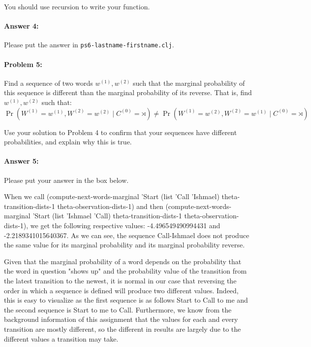 \documentclass[10pt]{article}
\newenvironment{AnswerBox}{\begin{mdframed}[style=simple]}{\end{mdframed}}
\newcommand{\PSnum}{6}
\begin{document}
You should use recursion to write your function. 

\paragraph{Answer 4:} Please put the answer in
\texttt{ps\PSnum-lastname-firstname.clj}.

\hrulefill%

\paragraph{Problem 5:}
Find a sequence of two words $w^{(1)},w^{(2)}$ such that the marginal
probability of this sequence is different than the marginal
probability of its reverse. That is, find $w^{(1)},w^{(2)}$ such that:
\begin{equation*}
  \Pr(W^{(1)}=w^{(1)}, W^{(2)} =w^{(2)} \mid C^{(0)}=\rtimes )
  \neq \Pr(W^{(1)}=w^{(2)}, W^{(2)} =w^{(1)} \mid C^{(0)}=\rtimes )
\end{equation*}

Use your solution to Problem 4 to confirm that your sequences have
different probabilities, and explain why this is true.

\paragraph{Answer 5:} Please put your answer in the box below.

\begin{AnswerBox}%


    When we call (compute-next-words-marginal 'Start (list 'Call 'Ishmael) theta-transition-dists-1 theta-observation-dists-1) and then (compute-next-words-marginal 'Start (list 'Ishmael 'Call) theta-transition-dists-1 theta-observation-dists-1), we get the following respective values: -4.496549490994431 and -2.2189341015640367. As we can see, the sequence Call-Ishmael does not produce the same value for its marginal probability and its marginal probability reverse. 

Given that the marginal probability of a word depends on the probability that the word in question "shows up" and the probability value of the transition from the latest transition to the newest, it is normal in our case that reversing the order in which a sequence is defined will produce two different values. Indeed, this is easy to visualize as the first sequence is as follows Start to Call to me and the second sequence is Start to me to Call. Furthermore, we know from the background information of this assignment that the values for each and every transition are mostly different, so the different in results are largely due to the different values a transition may take. 

\end{AnswerBox}%
\end{document}
